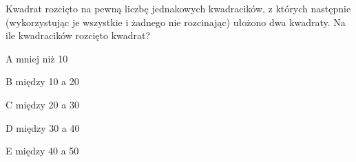 \begin{tresc}
Kwadrat rozcięto na pewną liczbę jednakowych kwadracików, z których następnie (wykorzystując je wszystkie i żadnego nie rozcinając) ułożono dwa kwadraty. Na ile kwadracików rozcięto kwadrat?
\end{tresc}
\begin{wariant}{A} mniej niż 10 \end{wariant}
\begin{wariant}{B} między 10 a 20 \end{wariant}
\begin{wariant}{C} między 20 a 30 \end{wariant}
\begin{wariant}{D} między 30 a 40 \end{wariant}
\begin{wariant}{E} między 40 a 50 \end{wariant}
